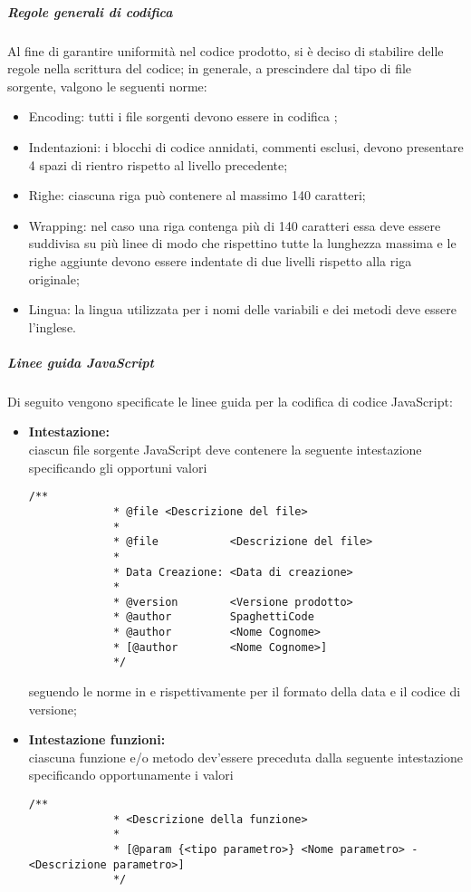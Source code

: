 \subparagraph{Regole generali di codifica}
\label{par:stile_codifica}

Al fine di garantire uniformità nel codice prodotto, si è deciso di stabilire delle regole nella scrittura del codice; in generale, a
prescindere dal tipo di file sorgente, valgono le seguenti norme:
\begin{itemize}
	\item Encoding: tutti i file sorgenti devono essere in codifica ;
    \item Indentazioni: i blocchi di codice annidati, commenti esclusi, devono presentare 4 spazi di rientro rispetto al livello precedente;
    \item Righe: ciascuna riga può contenere al massimo 140 caratteri;
    \item Wrapping: nel caso una riga contenga più di 140 caratteri essa deve essere suddivisa su più linee di modo che rispettino tutte
    	la lunghezza massima e le righe aggiunte devono essere indentate di due livelli rispetto alla riga originale;
    \item Lingua: la lingua utilizzata per i nomi delle variabili e dei metodi deve essere l'inglese.
\end{itemize}



\subparagraph{Linee guida JavaScript}
\label{par:convenzioni_javascript}

Di seguito vengono specificate le linee guida per la codifica di codice JavaScript:
\begin{itemize}
	\item \textbf{Intestazione:} \\
		ciascun file sorgente JavaScript deve contenere la seguente intestazione specificando gli opportuni valori
		\begin{lstlisting}[style=htmlcssjs]
			/**
	 	 	 * @file <Descrizione del file>
	 	 	 *
	 	 	 * @file           <Descrizione del file>
	 	 	 *
	 	 	 * Data Creazione: <Data di creazione>
	 	 	 *
	 	 	 * @version        <Versione prodotto>
	 	 	 * @author         SpaghettiCode
	 	 	 * @author         <Nome Cognome>
	 	 	 * [@author        <Nome Cognome>]
	 	 	 */
		\end{lstlisting}
		seguendo le norme in  e  rispettivamente per il formato della data e il codice di versione;
	\item \textbf{Intestazione funzioni:} \\
		ciascuna funzione e/o metodo dev'essere preceduta dalla seguente intestazione specificando opportunamente i valori
		\begin{lstlisting}[style=htmlcssjs]
			/**
			 * <Descrizione della funzione>
			 *
			 * [@param {<tipo parametro>} <Nome parametro> - <Descrizione parametro>]
			 */
		\end{lstlisting}
\end{itemize}

